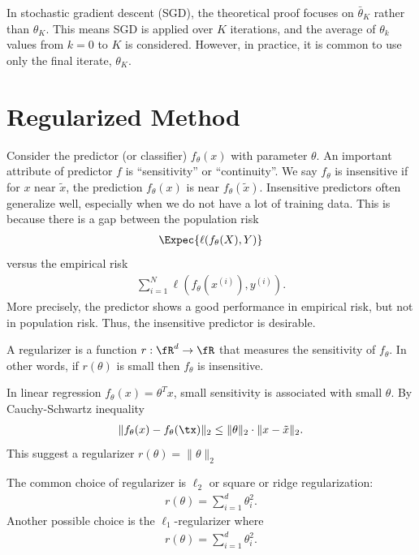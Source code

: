 \documentclass{article}
\begin{document}
\begin{remark}
In stochastic gradient descent (SGD), the theoretical proof focuses on $\bar{\theta}_K$ rather than $\theta_K$.
This means SGD is applied over $K$ iterations, and the average of $\theta_k$ values from $k = 0$ to $K$ is considered. 
However, in practice, it is common to use only the final iterate, $\theta_K$.
\end{remark}


\section{Regularized Method}
Consider the predictor (or classifier) $f_\theta(x)$ with parameter $\theta$.
An important attribute of predictor $f$ is ``sensitivity'' or ``continuity''.
We say $f_\theta$ is insensitive if for $x$ near $\tilde{x}$, the prediction $f_\theta(x)$ is near $f_\theta(\tilde{x})$.
Insensitive predictors often generalize well, especially when we do not have a lot of training data.
This is because there is a gap between the population risk
\begin{align}
    \Expec{\ell(f_\theta(X), Y)}
\end{align}
versus the empirical risk
\begin{align}
    \sum_{i=1}^N \ell(f_\theta(x^{(i)}), y^{(i)}).
\end{align}
More precisely, the predictor shows a good performance in empirical risk, 
but not in population risk.
Thus, the insensitive predictor is desirable.

A regularizer is a function $r:\fR^d \rightarrow \fR$ that measures the sensitivity of $f_\theta$.
In other words, if $r(\theta)$ is small then $f_\theta$ is insensitive.

\begin{example}
    In linear regression $f_\theta(x) = \theta^T x$, small sensitivity is associated with small $\theta$.
    By Cauchy-Schwartz inequality
    \begin{align}
        \|f_\theta(x) - f_\theta(\tx)\|_2 \leq\|\theta\|_2 \cdot \|x-\tilde{x}\|_2.
    \end{align}
    This suggest a regularizer $r(\theta) = \|\theta\|_2$
\end{example}

The common choice of regularizer is $\ell_2$ or square or ridge regularization:
\begin{align}
    r(\theta) = \sum_{i=1}^d \theta_i^2.
\end{align}
Another possible choice is the $\ell_1$-regularizer where
\begin{align}
    r(\theta) = \sum_{i=1}^d \theta_i^2.
\end{align}
\end{document}
